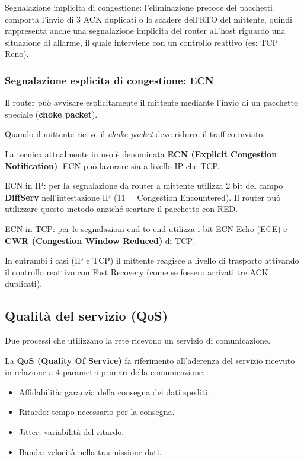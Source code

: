             Segnalazione implicita di congestione: l'eliminazione precoce dei pacchetti comporta l'invio di 3 ACK duplicati o lo scadere dell'RTO del mittente, quindi rappresenta anche una segnalazione implicita del router all'host riguardo una situazione di allarme, il quale interviene con un controllo reattivo (es: TCP Reno).

        \subsubsection{Segnalazione esplicita di congestione: ECN}
            Il router può avvisare esplicitamente il mittente mediante l'invio di un pacchetto speciale (\textbf{choke packet}).
        
            Quando il mittente riceve il \textit{choke packet} deve ridurre il traffico inviato.
        
            La tecnica attualmente in uso è denominata \textbf{ECN (Explicit Congestion Notification)}. ECN può lavorare sia a livello IP che TCP.
        
            ECN in IP: per la segnalazione da router a mittente utilizza 2 bit del campo \textbf{DiffServ} nell'intestazione IP (11 = Congestion Encountered). Il router può utilizzare questo metodo anziché scartare il pacchetto con RED.
        
            ECN in TCP: per le segnalazioni end-to-end utilizza i bit ECN-Echo (ECE) e \textbf{CWR (Congestion Window Reduced)} di TCP.
        
            In entrambi i casi (IP e TCP) il mittente reagisce a livello di trasporto attivando il controllo reattivo con Fast Recovery (come se fossero arrivati tre ACK duplicati).
        
    \subsection{Qualità del servizio (QoS)}
        Due processi che utilizzano la rete ricevono un servizio di comunicazione.
    
        La \textbf{QoS (Quality Of Service)} fa riferimento all'aderenza del servizio ricevuto in relazione a 4 parametri primari della comunicazione:
        \begin{itemize}
            \item Affidabilità: garanzia della consegna dei dati spediti.
            \item Ritardo: tempo necessario per la consegna.
            \item Jitter: variabilità del ritardo.
            \item Banda: velocità nella trasmissione dati.
        \end{itemize}

